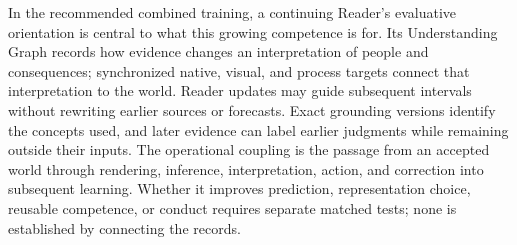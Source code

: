 \documentclass[10pt]{article}
\begin{document}
In the recommended combined training, a continuing Reader's evaluative
orientation is central to what this growing competence is for. Its
Understanding Graph records how evidence changes an interpretation of people
and consequences; synchronized native, visual, and process targets connect
that interpretation to the world. Reader updates may guide subsequent
intervals without rewriting earlier sources or forecasts. Exact grounding
versions identify the concepts used, and later evidence can label earlier
judgments while remaining outside their inputs. The operational coupling is
the passage from an accepted world through rendering, inference,
interpretation, action, and correction into subsequent learning. Whether it
improves prediction, representation choice, reusable competence, or conduct
requires separate matched tests; none is established by connecting the records.
\end{document}
